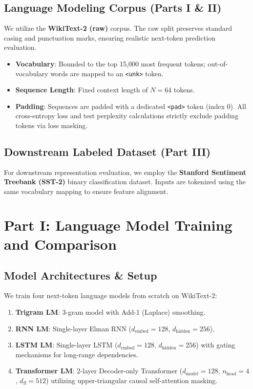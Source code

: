 \documentclass[10pt,twocolumn,3 authorization]{article}
\begin{document}
\subsection{Language Modeling Corpus (Parts I \& II)}
We utilize the \textbf{WikiText-2 (raw)} corpus. The raw split preserves standard casing and punctuation marks, ensuring realistic next-token prediction evaluation. 
\begin{itemize}
    \item \textbf{Vocabulary}: Bounded to the top 15,000 most frequent tokens; out-of-vocabulary words are mapped to an \texttt{<unk>} token.
    \item \textbf{Sequence Length}: Fixed context length of $N = 64$ tokens.
    \item \textbf{Padding}: Sequences are padded with a dedicated \texttt{<pad>} token (index 0). All cross-entropy loss and test perplexity calculations strictly exclude padding tokens via loss masking.
\end{itemize}

\subsection{Downstream Labeled Dataset (Part III)}
For downstream representation evaluation, we employ the \textbf{Stanford Sentiment Treebank (SST-2)} binary classification dataset. Inputs are tokenized using the same vocabulary mapping to ensure feature alignment.

\section{Part I: Language Model Training and Comparison}
\subsection{Model Architectures \& Setup}
We train four next-token language models from scratch on WikiText-2:
\begin{enumerate}
    \item \textbf{Trigram LM}: 3-gram model with Add-1 (Laplace) smoothing.
    \item \textbf{RNN LM}: Single-layer Elman RNN ($d_{\text{embed}}=128$, $d_{\text{hidden}}=256$).
    \item \textbf{LSTM LM}: Single-layer LSTM ($d_{\text{embed}}=128$, $d_{\text{hidden}}=256$) with gating mechanisms for long-range dependencies.
    \item \textbf{Transformer LM}: 2-layer Decoder-only Transformer ($d_{\text{model}}=128$, $n_{\text{head}}=4$, $d_{\text{ff}}=512$) utilizing upper-triangular causal self-attention masking.
\end{enumerate}
\end{document}
